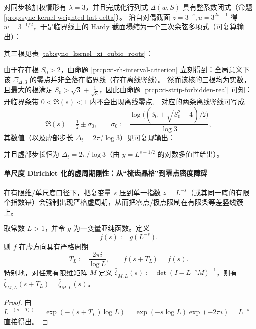 \begin{remark}[同步核加权情形的三次余弦多项式与离线零点列]\label{rem:sync-kernel-xi-cubic}
对同步核加权情形有 \(\lambda=3\)，并且完成化行列式 \(\widehat\Delta(w,S)\) 具有整系数闭式（命题 \ref{prop:sync-kernel-weighted-hat-delta}）。
沿自对偶截面 \(z=3^{-s},u=3^{2s-1}\) 得 \(w=3^{-1/2}\)，于是临界线上的 Hardy 截面塌缩为一个三次余弦多项式（可复算输出）：

其三根见表 \ref{tab:sync_kernel_xi_cubic_roots}：

由于存在根 \(S_0>2\)，由命题 \ref{prop:xi-rh-interval-criterion} 立刻得到：全局意义下该 \(\Xi_{\Delta,3}\) 的零点并非全落在临界线（存在离线竖线）。
然而该核的三根均为实数，且最大的根满足 \(S_0>\sqrt{3}+\tfrac{1}{\sqrt{3}}\)，因此由命题 \ref{prop:xi-strip-forbidden-real} 可知：开临界条带 \(0<\Re(s)<1\) 内不会出现离线零点。
对应的两条离线竖线可写成
\[
\Re(s)=\tfrac12\pm\sigma_0,\qquad
\sigma_0:=\frac{\log\bigl((S_0+\sqrt{S_0^2-4})/2\bigr)}{\log 3},
\]
其数值（以及虚部步长 \(\Delta_t=2\pi/\log 3\)）见可复现输出：

并且虚部步长恒为 \(\Delta_t=2\pi/\log 3\)（由 \(y=L^{s-1/2}\) 的对数多值性给出）。
\end{remark}

\paragraph{单尺度 Dirichlet 化的虚周期刚性：从“梳齿晶格”到零点密度障碍}
在有限维/单尺度口径下，把复变量 \(s\) 压到单一指数 \(z=L^{-s}\)（或其同一底的有限个指数幂）会强制出现严格虚周期，从而把零点/极点限制在有限条等差竖线簇上。

\begin{proposition}\label{prop:single-scale-dirichlet-imag-period}
取常数 \(L>1\)，并令 \(g\) 为一变量亚纯函数。定义
\[
f(s):=g(L^{-s}).
\]
则 \(f\) 在虚方向具有严格周期
\[
T_L:=\frac{2\pi i}{\log L},\qquad f(s+T_L)=f(s).
\]
特别地，对任意有限维矩阵 \(M\) 定义
\(
\widehat{\zeta}_{M,L}(s):=\det(I-L^{-s}M)^{-1}
\)，则有 \(\widehat{\zeta}_{M,L}(s+T_L)=\widehat{\zeta}_{M,L}(s)\)。
\end{proposition}
\begin{proof}
由 \(L^{-(s+T_L)}=\exp(-(s+T_L)\log L)=\exp(-s\log L)\exp(-2\pi i)=L^{-s}\) 直接得出。
\end{proof}

